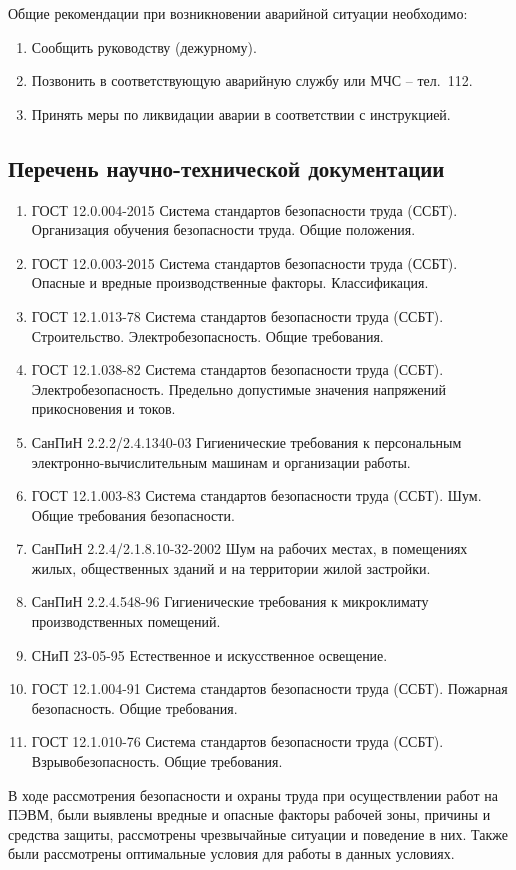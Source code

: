 Общие рекомендации при возникновении аварийной ситуации необходимо:
\begin{enumerate}
    \item Сообщить руководству (дежурному).
    \item Позвонить в соответствующую аварийную службу или МЧС -- тел.~112.
    \item Принять меры по ликвидации аварии в соответствии с инструкцией.
\end{enumerate}


\subsection{Перечень научно-технической документации}

\begin{enumerate}[leftmargin=\labelwidth+\labelsep]
    \item ГОСТ 12.0.004-2015 Система стандартов безопасности труда (ССБТ). Организация обучения безопасности труда. Общие положения.
    \item ГОСТ 12.0.003-2015 Система стандартов безопасности труда (ССБТ). Опасные и вредные производственные факторы. Классификация.
    \item ГОСТ 12.1.013-78 Система стандартов безопасности труда (ССБТ). Строительство. Электробезопасность. Общие требования.
    \item ГОСТ 12.1.038-82 Система стандартов безопасности труда (ССБТ). Электробезопасность. Предельно допустимые значения напряжений прикосновения и токов.
    \item СанПиН 2.2.2/2.4.1340-03 Гигиенические требования к персональным электронно-вычислительным машинам и организации работы.
    \item ГОСТ 12.1.003-83 Система стандартов безопасности труда (ССБТ). Шум. Общие требования безопасности.
    \item СанПиН 2.2.4/2.1.8.10-32-2002 Шум на рабочих местах, в помещениях жилых, общественных зданий и на территории жилой застройки.
    \item СанПиН 2.2.4.548-96 Гигиенические требования к микроклимату производственных помещений.
    \item СНиП 23-05-95 Естественное и искусственное освещение.
    \item ГОСТ 12.1.004-91 Система стандартов безопасности труда (ССБТ). Пожарная безопасность. Общие требования.
    \item ГОСТ 12.1.010-76 Система стандартов безопасности труда (ССБТ). Взрывобезопасность. Общие требования.
\end{enumerate}



В ходе рассмотрения безопасности и охраны труда при осуществлении работ на ПЭВМ, были выявлены вредные и опасные факторы рабочей зоны, причины и средства защиты, рассмотрены чрезвычайные ситуации и поведение в них. 
Также были рассмотрены оптимальные условия для работы в данных условиях.